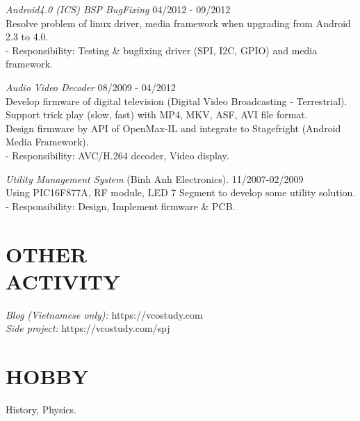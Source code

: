 \documentclass[margin]{res}
\begin{document}
\begin{resume}
                {\sl Android4.0 (ICS) BSP BugFixing} \hfill            04/2012 - 09/2012\\
		 Resolve problem of linux driver, media framework when upgrading from Android 2.3 to 4.0.\\
		 - Responsibility: Testing \& bugfixing driver (SPI, I2C, GPIO) and media framework.


                {\sl Audio Video Decoder} \hfill            08/2009 - 04/2012 \\
                 Develop firmware of digital television (Digital Video Broadcasting - Terrestrial).\\
                 Support trick play (slow, fast) with MP4, MKV, ASF, AVI file format.\\
                 Design firmware by API of OpenMax-IL and integrate to Stagefright (Android Media Framework).\\
		 - Responsibility: AVC/H.264 decoder, Video display.


                {\sl Utility Management System} (Binh Anh Electronics). \hfill        11/2007-02/2009 \\
                Using PIC16F877A, RF module, LED 7 Segment to develop some utility solution.\\
		- Responsibility: Design, Implement firmware \& PCB.

 
\section{OTHER \\ ACTIVITY}  
		{\sl Blog (Vietnamese only):} https://vcostudy.com \\
		{\sl Side project:} https://vcostudy.com/spj

\section{HOBBY}  History, Physics.


\end{resume}
\end{document}
